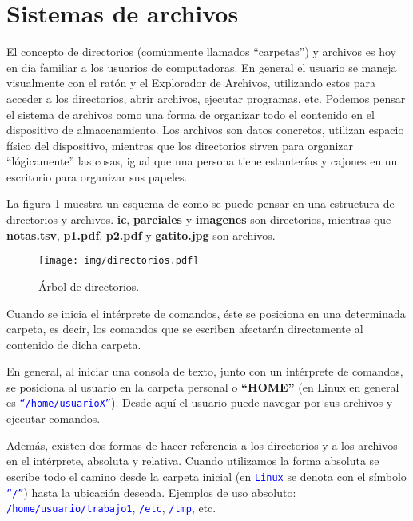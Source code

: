 \documentclass[12pt]{article}
\newcommand{\cw}[1]{\mbox{\texttt{\textcolor{blue}{#1}}}}
\begin{document}
\section{Sistemas de archivos}

El concepto de directorios (comúnmente llamados ``carpetas'') y archivos es
hoy en día familiar a los usuarios de computadoras. En general el usuario se
maneja visualmente con el ratón y el Explorador de Archivos, utilizando estos
para acceder a los directorios, abrir archivos, ejecutar programas, etc.
Podemos pensar el sistema de archivos como una forma de organizar todo el
contenido en el dispositivo de almacenamiento. Los archivos son datos
concretos, utilizan espacio físico del dispositivo, mientras que los
directorios sirven para organizar ``lógicamente'' las cosas, igual que una
persona tiene estanterías y cajones en un escritorio para organizar sus
papeles.

La figura \ref{arbolDirectorios} muestra un esquema de como se puede pensar en
una estructura de directorios y archivos. \textbf{ic}, \textbf{parciales} y
\textbf{imagenes} son directorios, mientras que \textbf{notas.tsv},
\textbf{p1.pdf}, \textbf{p2.pdf} y \textbf{gatito.jpg} son archivos.

\begin{figure}[!htb]

    \centering

    \texttt{[image: img/directorios.pdf]}

    \caption{Árbol de directorios.}

    \label{arbolDirectorios}

\end{figure}

Cuando se inicia el intérprete de comandos, éste se posiciona en una
determinada carpeta, es decir, los comandos que se escriben afectarán
directamente al contenido de dicha carpeta.

En general, al iniciar una consola de texto, junto con un intérprete de
comandos, se posiciona al usuario en la carpeta personal o \textbf{``HOME''}
(en Linux en general es \cw{``/home/usuarioX''}). Desde aquí el usuario
puede navegar por sus archivos y ejecutar comandos.

Además, existen dos formas de hacer referencia a los directorios y a los
archivos en el intérprete, absoluta y relativa. Cuando utilizamos la forma
absoluta se escribe todo el camino desde la carpeta inicial (en \cw{Linux}
se denota con el símbolo \cw{``/''}) hasta la ubicación deseada. Ejemplos de
uso absoluto: \cw{/home/usuario/trabajo1}, \cw{/etc}, \cw{/tmp}, etc.
\end{document}
